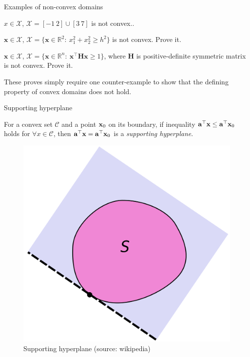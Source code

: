\documentclass{beamer}
\begin{document}
\begin{frame}{Examples of non-convex domains}
	\begin{flushleft}
		
		
		$x \in \mathcal{X}$, $\mathcal{X} = [-1 \ 2] \cup [3 \ 7]$ is not convex..
		
		\bigskip
		
		$\mathbf{x} \in \mathcal{X}$, $\mathcal{X} = \{ \mathbf{x} \in \mathbb{R}^2: \ x_1^2+x_2^2 \geq h^2 \}$ is not convex. Prove it.
		
		\bigskip
		
		$\mathbf{x} \in \mathcal{X}$, $\mathcal{X} = \{ \mathbf{x} \in \mathbb{R}^n: \ \mathbf{x}^\top \mathbf{H} \mathbf{x} \geq 1 \}$, where $\mathbf{H}$ is positive-definite symmetric matrix is not convex. Prove it.
		
		\bigskip
		
		These proves simply require one counter-example to show that the defining property of convex domains does not hold.
		
	\end{flushleft}
\end{frame}



\begin{frame}{Supporting hyperplane}
	\begin{flushleft}
		
		For a convex set $\mathcal C$ and a point $\mathbf{x}_0$ on its boundary, if inequality $\mathbf{a}^\top \mathbf{x} \leq \mathbf{a}^\top \mathbf{x}_0$ holds for $\forall x \in \mathcal C$, then $\mathbf{a}^\top \mathbf{x} = \mathbf{a}^\top \mathbf{x}_0$ is a \emph{supporting hyperplane}.
		
		\begin{figure}
			\centering
			\includegraphics[width=0.5\linewidth]{Supporting_hyperplane}
			\caption{Supporting hyperplane (source: wikipedia)}
			\label{fig:supportinghyperplane}
		\end{figure}
		
		
	\end{flushleft}
\end{frame}
\end{document}
